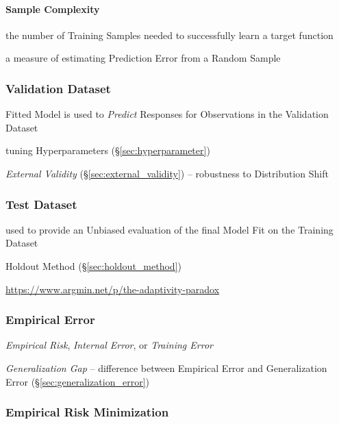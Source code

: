 \paragraph{Sample Complexity}\label{sec:sample_complexity}\hfill

the number of Training Samples needed to successfully learn a target function

a measure of estimating Prediction Error from a Random Sample



\subsubsection{Validation Dataset}\label{sec:validation_dataset}

Fitted Model is used to \emph{Predict} Responses for Observations in the
Validation Dataset

tuning Hyperparameters (\S\ref{sec:hyperparameter})

\emph{External Validity} (\S\ref{sec:external_validity}) -- robustness to
Distribution Shift



\subsubsection{Test Dataset}\label{sec:test_dataset}

used to provide an Unbiased evaluation of the final Model Fit on the Training
Dataset

Holdout Method (\S\ref{sec:holdout_method})

\url{https://www.argmin.net/p/the-adaptivity-paradox}



\subsubsection{Empirical Error}\label{sec:empirical_error}

\emph{Empirical Risk}, \emph{Internal Error}, or \emph{Training Error}

\emph{Generalization Gap} -- difference between Empirical Error and
Generalization Error (\S\ref{sec:generalization_error})



\subsubsection{Empirical Risk Minimization}\label{sec:empirical_risk}

